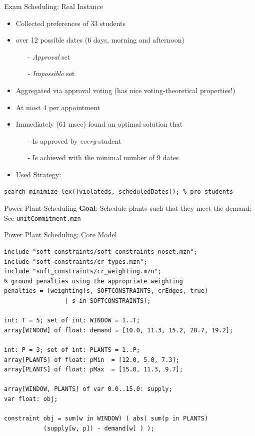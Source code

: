 \documentclass[10pt,xcolor={dvipsnames},fleqn]{beamer}
\begin{document}
\begin{frame}[fragile]{Exam Scheduling: Real Instance}

\begin{itemize}
\item Collected preferences of 33 students
\item over 12 possible dates (6 days, morning and afternoon)
\begin{itemize}
\item[-] \emph{Approval} set 
\item[-] \emph{Impossible} set 
\end{itemize}

\vspace*{2ex}

\item Aggregated via \alert{approval voting} (has nice voting-theoretical properties!)
\item At most 4 per appointment

\item Immediately (61 msec) found an optimal solution that
\begin{itemize}
\item[-] Is approved by \emph{every} student
\item[-] Is achieved with the minimal number of 9 dates 
\end{itemize}
\item Used Strategy:
\end{itemize}
\begin{lstlisting}
search minimize_lex([violateds, scheduledDates]); % pro students
\end{lstlisting}
\end{frame}

\begin{frame}[fragile]{Power Plant Scheduling}
\textbf{Goal}: Schedule plants such that they meet the \alert{demand}; See \texttt{unitCommitment.mzn}


\end{frame}

\begin{frame}[fragile]{Power Plant Scheduling: Core Model}
\begin{lstlisting}
include "soft_constraints/soft_constraints_noset.mzn";
include "soft_constraints/cr_types.mzn";
include "soft_constraints/cr_weighting.mzn";
% ground penalties using the appropriate weighting
penalties = [weighting(s, SOFTCONSTRAINTS, crEdges, true) 
                 | s in SOFTCONSTRAINTS];

int: T = 5; set of int: WINDOW = 1..T;
array[WINDOW] of float: demand = [10.0, 11.3, 15.2, 20.7, 19.2];

int: P = 3; set of int: PLANTS = 1..P;
array[PLANTS] of float: pMin  = [12.0, 5.0, 7.3];
array[PLANTS] of float: pMax  = [15.0, 11.3, 9.7];

array[WINDOW, PLANTS] of var 0.0..15.0: supply; 
var float: obj;

constraint obj = sum(w in WINDOW) ( abs( sum(p in PLANTS) 
           (supply[w, p]) - demand[w] ) );

\end{lstlisting}
\end{frame}
\end{document}
